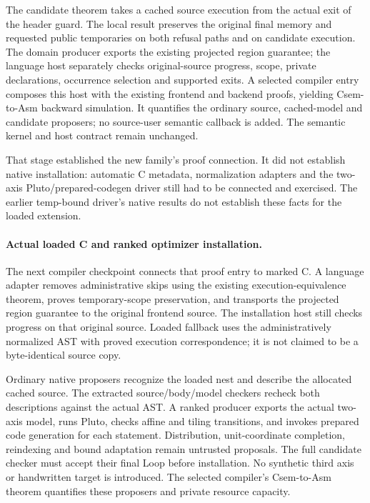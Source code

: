 The candidate theorem takes a cached source execution from the actual exit
of the header guard. The local result preserves the
original final memory and requested public temporaries on both refusal paths
and on candidate execution. The domain producer exports the existing
projected region guarantee; the language host separately checks original-source
progress, scope, private declarations, occurrence selection and supported exits.
A selected compiler entry composes this host with the existing frontend and
backend proofs, yielding Csem-to-Asm backward simulation. It quantifies the
ordinary source, cached-model and candidate proposers; no source-user semantic
callback is added. The semantic kernel and host contract remain unchanged.

That stage established the new family's proof connection. It did not establish
native installation: automatic C metadata, normalization adapters and the
two-axis Pluto/prepared-codegen driver still had to be connected and exercised.
The earlier temp-bound driver's native results do not establish these facts for
the loaded extension.

\paragraph{Actual loaded C and ranked optimizer installation.}
The next compiler checkpoint connects that proof entry to marked C. A language
adapter removes administrative skips using the existing execution-equivalence
theorem, proves temporary-scope preservation, and transports the projected
region guarantee to the original frontend source. The installation host still
checks progress on that original source. Loaded fallback uses the
administratively normalized AST with proved execution correspondence; it is
not claimed to be a byte-identical source copy.

Ordinary native proposers recognize the loaded nest and describe the allocated
cached source. The extracted source/body/model checkers recheck both descriptions
against the actual AST. A ranked producer exports the actual two-axis model,
runs Pluto, checks affine and tiling transitions, and invokes prepared code
generation for each statement. Distribution, unit-coordinate completion,
reindexing and bound adaptation remain untrusted proposals. The full candidate
checker must accept their final Loop before installation. No synthetic third
axis or handwritten target is introduced. The selected compiler's
Csem-to-Asm theorem quantifies these proposers and private resource capacity.

